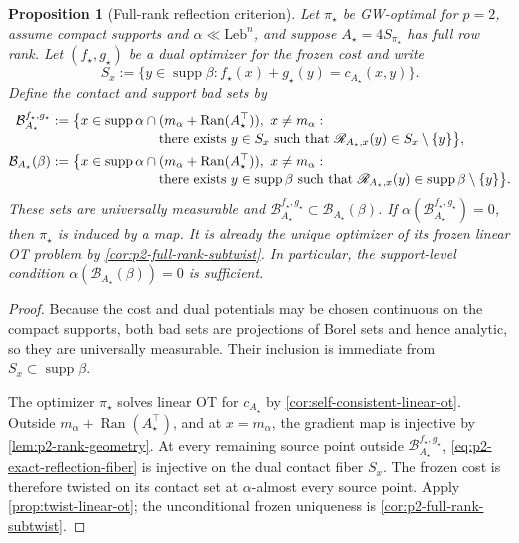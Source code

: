 \documentclass[11pt,a4paper]{article}
\newtheorem{proposition}[theorem]{Proposition}
\theoremstyle{definition}
\theoremstyle{remark}
\newcommand{\supp}{\operatorname{supp}}
\newcommand{\Ran}{\operatorname{Ran}}
\begin{document}
\begin{proposition}[Full-rank reflection criterion]
\label{prop:p2-full-rank-reflection-criterion}
Let \(\pi_\star\) be GW-optimal for \(p=2\), assume compact supports and
\(\alpha\ll\mathrm{Leb}^n\), and suppose
\(A_\star=4S_{\pi_\star}\) has full row rank.  Let
\((f_\star,g_\star)\) be a dual optimizer for the frozen cost and write
\begin{equation*}
  S_x:=\bigl\{y\in\supp\beta:
  f_\star(x)+g_\star(y)=c_{A_\star}(x,y)\bigr\}.
\end{equation*}
Define the contact and support bad sets by
\begin{align}
  \mathcal B^{f_\star,g_\star}_{A_\star}
  &:=\bigl\{x\in\supp\alpha\cap(m_\alpha+\Ran(A_\star^\top)),\
       x\ne m_\alpha:\notag\\[-1mm]
  &\hspace{28mm}\text{there exists }y\in S_x\text{ such that }
       \mathscr R_{A_\star,x}(y)\in S_x\setminus\{y\}\bigr\},
       \label{eq:p2-bad-contact-reflection-set}\\
  \mathcal B_{A_\star}(\beta)
  &:=\bigl\{x\in\supp\alpha\cap(m_\alpha+\Ran(A_\star^\top)),\
       x\ne m_\alpha:\notag\\[-1mm]
  &\hspace{28mm}\text{there exists }y\in\supp\beta\text{ such that }
       \mathscr R_{A_\star,x}(y)
       \in\supp\beta\setminus\{y\}\bigr\}.
  \label{eq:p2-bad-reflection-source-set}
\end{align}
These sets are universally measurable and
\(\mathcal B^{f_\star,g_\star}_{A_\star}
 \subset\mathcal B_{A_\star}(\beta)\).  If
\(\alpha(\mathcal B^{f_\star,g_\star}_{A_\star})=0\), then \(\pi_\star\) is
induced by a map.  It is already the unique optimizer of its frozen linear OT
problem by \cref{cor:p2-full-rank-subtwist}.  In particular, the support-level condition
\(\alpha(\mathcal B_{A_\star}(\beta))=0\) is sufficient.
\end{proposition}

\begin{proof}
Because the cost and dual potentials may be chosen continuous on the compact
supports, both bad sets are projections of Borel sets and hence analytic, so
they are universally measurable.  Their inclusion is immediate from
\(S_x\subset\supp\beta\).

The optimizer \(\pi_\star\) solves linear OT for \(c_{A_\star}\) by
\cref{cor:self-consistent-linear-ot}.  Outside
\(m_\alpha+\Ran(A_\star^\top)\), and at \(x=m_\alpha\), the gradient map is
injective by \cref{lem:p2-rank-geometry}.  At every remaining source point
outside \(\mathcal B^{f_\star,g_\star}_{A_\star}\),
\eqref{eq:p2-exact-reflection-fiber} is injective on the dual contact fiber
\(S_x\).  The frozen cost is therefore twisted on its contact set at
\(\alpha\)-almost every source point.  Apply \cref{prop:twist-linear-ot}; the
unconditional frozen uniqueness is \cref{cor:p2-full-rank-subtwist}.
\end{proof}
\end{document}
